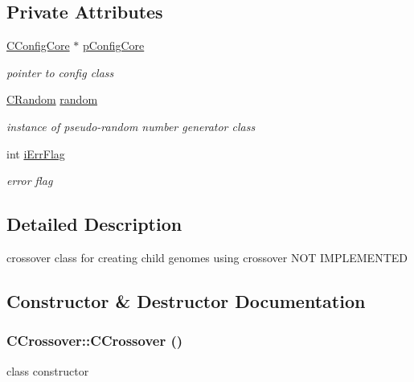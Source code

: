 \subsection*{Private Attributes}
\begin{DoxyCompactItemize}
\item 
\hypertarget{classCCrossover_aef34634bbba11d255a041f24f373e904}{
\hyperlink{classCConfigCore}{CConfigCore} $\ast$ \hyperlink{classCCrossover_aef34634bbba11d255a041f24f373e904}{pConfigCore}}
\label{classCCrossover_aef34634bbba11d255a041f24f373e904}

\begin{DoxyCompactList}\small\item\em pointer to config class \item\end{DoxyCompactList}\item 
\hypertarget{classCCrossover_ab88ffcc10435d5def6a1fcd7386c9955}{
\hyperlink{classCRandom}{CRandom} \hyperlink{classCCrossover_ab88ffcc10435d5def6a1fcd7386c9955}{random}}
\label{classCCrossover_ab88ffcc10435d5def6a1fcd7386c9955}

\begin{DoxyCompactList}\small\item\em instance of pseudo-\/random number generator class \item\end{DoxyCompactList}\item 
\hypertarget{classCCrossover_a73a6823eff615be84d341185cae0e2a1}{
int \hyperlink{classCCrossover_a73a6823eff615be84d341185cae0e2a1}{iErrFlag}}
\label{classCCrossover_a73a6823eff615be84d341185cae0e2a1}

\begin{DoxyCompactList}\small\item\em error flag \item\end{DoxyCompactList}\end{DoxyCompactItemize}


\subsection{Detailed Description}
crossover class for creating child genomes using crossover NOT IMPLEMENTED 

\subsection{Constructor \& Destructor Documentation}
\hypertarget{classCCrossover_a9877d88681846a002372d26fb450a1b8}{
\subsubsection[{CCrossover}]{\setlength{\rightskip}{0pt plus 5cm}CCrossover::CCrossover ()}}
\label{classCCrossover_a9877d88681846a002372d26fb450a1b8}
class constructor 


